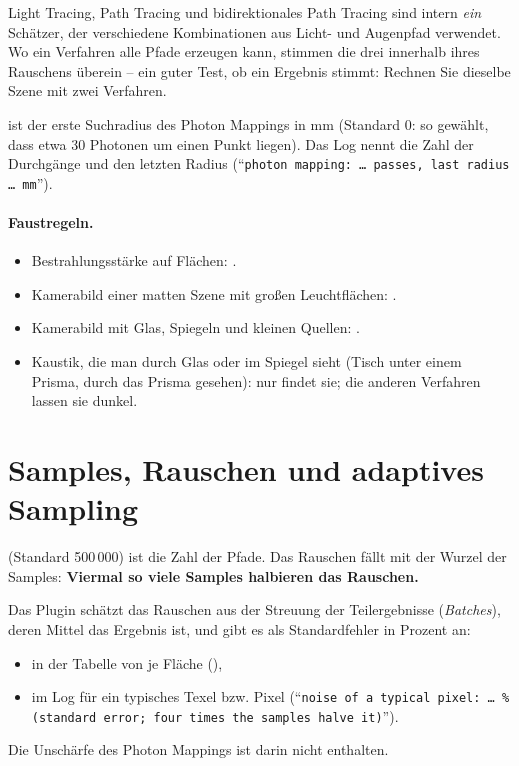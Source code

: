 Light Tracing, Path Tracing und bidirektionales Path Tracing sind intern \emph{ein} Schätzer, der
verschiedene Kombinationen aus Licht- und Augenpfad verwendet. Wo ein Verfahren alle Pfade
erzeugen kann, stimmen die drei innerhalb ihres Rauschens überein -- ein guter Test, ob ein
Ergebnis stimmt: Rechnen Sie dieselbe Szene mit zwei Verfahren.

 ist der erste Suchradius des Photon Mappings in mm (Standard 0: so gewählt,
dass etwa 30 Photonen um einen Punkt liegen). Das Log nennt die Zahl der Durchgänge und den
letzten Radius (\enquote{\texttt{photon mapping: … passes, last radius … mm}}).

\paragraph{Faustregeln.}
\begin{itemize}
  \item Bestrahlungsstärke auf Flächen: .
  \item Kamerabild einer matten Szene mit großen Leuchtflächen: .
  \item Kamerabild mit Glas, Spiegeln und kleinen Quellen: .
  \item Kaustik, die man durch Glas oder im Spiegel sieht (Tisch unter einem Prisma, durch das
    Prisma gesehen): nur  findet sie; die anderen Verfahren lassen sie dunkel.
\end{itemize}

\section{Samples, Rauschen und adaptives Sampling}\label{sec:pt-rauschen}

 (Standard 500\,000) ist die Zahl der Pfade. Das Rauschen fällt mit der Wurzel der
Samples: \textbf{Viermal so viele Samples halbieren das Rauschen.}

Das Plugin schätzt das Rauschen aus der Streuung der Teilergebnisse (\emph{Batches}), deren
Mittel das Ergebnis ist, und gibt es als Standardfehler in Prozent an:
\begin{itemize}
  \item in der Tabelle von  je Fläche (),
  \item im Log für ein typisches Texel bzw. Pixel (\enquote{\texttt{noise of a typical pixel: …
    \% (standard error; four times the samples halve it)}}).
\end{itemize}
Die Unschärfe des Photon Mappings ist darin nicht enthalten.

